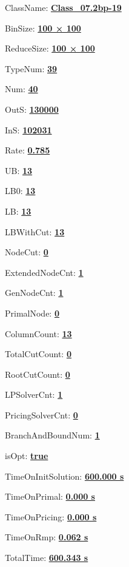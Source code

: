 \documentclass[11pt]{article}
\begin{document}
\pagestyle{empty}


ClassName: \underline{\textbf{Class_07.2bp-19}}
\par
BinSize: \underline{\textbf{100 × 100}}
\par
ReduceSize: \underline{\textbf{100 × 100}}
\par
TypeNum: \underline{\textbf{39}}
\par
Num: \underline{\textbf{40}}
\par
OutS: \underline{\textbf{130000}}
\par
InS: \underline{\textbf{102031}}
\par
Rate: \underline{\textbf{0.785}}
\par
UB: \underline{\textbf{13}}
\par
LB0: \underline{\textbf{13}}
\par
LB: \underline{\textbf{13}}
\par
LBWithCut: \underline{\textbf{13}}
\par
NodeCut: \underline{\textbf{0}}
\par
ExtendedNodeCnt: \underline{\textbf{1}}
\par
GenNodeCnt: \underline{\textbf{1}}
\par
PrimalNode: \underline{\textbf{0}}
\par
ColumnCount: \underline{\textbf{13}}
\par
TotalCutCount: \underline{\textbf{0}}
\par
RootCutCount: \underline{\textbf{0}}
\par
LPSolverCnt: \underline{\textbf{1}}
\par
PricingSolverCnt: \underline{\textbf{0}}
\par
BranchAndBoundNum: \underline{\textbf{1}}
\par
isOpt: \underline{\textbf{true}}
\par
TimeOnInitSolution: \underline{\textbf{600.000 s}}
\par
TimeOnPrimal: \underline{\textbf{0.000 s}}
\par
TimeOnPricing: \underline{\textbf{0.000 s}}
\par
TimeOnRmp: \underline{\textbf{0.062 s}}
\par
TotalTime: \underline{\textbf{600.343 s}}
\par
\newpage


\end{document}
